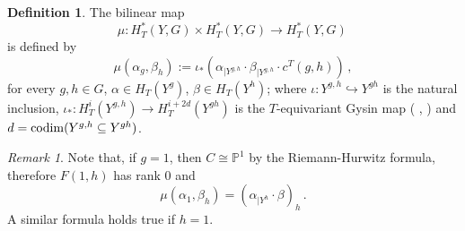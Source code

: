\documentclass[a4paper,reqno]{amsart}
\theoremstyle{plain} %
\theoremstyle{definition} %
\newtheorem{dfn}[thm]{Definition}
\theoremstyle{remark} %
\newtheorem{rmk}[thm]{Remark}
\newcommand{\pr}{\mathbb{P}}   %
\newcommand{\1}{\mathds{1}}   %
\begin{document}
\begin{dfn}
The bilinear map 
$$
\mu \colon H^*_T(Y, G) \times H^*_T(Y, G) \to H^*_T(Y, G) \, 
$$
is defined by
$$
\mu (\alpha_g, \beta_h) := \iota_* \left( \alpha_{|Y^{g,h}} \cdot \beta_{|Y^{g,h}} \cdot c^T(g,h) \right) \, ,
$$
for every $g, h \in G$, $\alpha \in H_T(Y^g)$, $\beta \in H_T(Y^h)$; where
$\iota \colon Y^{g, h} \hookrightarrow Y^{gh}$ is the natural  inclusion, $\iota_* \colon H^i_T(Y^{g,h}) \to H^{i+2d}_T(Y^{gh})$ 
is the $T$-equivariant Gysin map ( \cite[Ch. 3.6]{AF}, \cite{BGNX}) and $d= {\rm codim} (Y^{g,h} \subseteq Y^{gh})$.
\end{dfn}

\begin{rmk}\label{mu1}
Note that, if $g=1$, then $C\cong \pr^1$ by the  Riemann-Hurwitz formula, therefore 
$F(1,h)$ has rank $0$ and 
$$
\mu (\alpha_1, \beta_h) =  \left( \alpha_{|Y^{h}} \cdot \beta  \right)_h \, . 
$$
A similar formula holds true if $h=1$.
\end{rmk}
\end{document}
